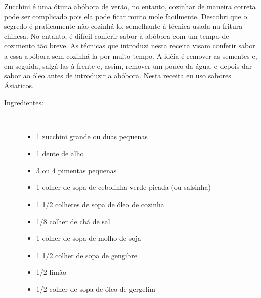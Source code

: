 \documentclass[11pt,letterpaper]{article}
\begin{document}


Zucchini é uma ótima abóbora de verão, no entanto, cozinhar de maneira correta pode ser complicado pois ela pode ficar muito mole facilmente. Descobri que o segredo é praticamente não cozinhá-lo, semelhante à técnica usada na fritura chinesa. No entanto, é difícil conferir sabor à abóbora com um tempo de cozimento tão breve. As técnicas que introduzi nesta receita visam conferir sabor a essa abóbora sem cozinhá-la por muito tempo. A idéia é remover as sementes e, em seguida, salgá-las à frente e, assim, remover um pouco da água, e depois dar sabor ao óleo antes de introduzir a abóbora. Nesta receita eu uso sabores Ásiaticos.

\begin {description}

\item [Ingredientes:] \ \\
\begin {itemize}
\item 1 zucchini grande ou duas pequenas
\item 1 dente de alho
\item 3 ou 4 pimentas pequenas
\item 1 colher de sopa de cebolinha verde picada (ou salsinha)
\item 1 1/2 colheres de sopa de óleo de cozinha
\item 1/8 colher de chá de sal
        \item 1 colher de sopa de molho de soja
        \item 1 1/2 colher de sopa de gengibre
        \item 1/2 limão
        \item 1/2 colher de sopa de óleo de gergelim
\end {itemize}


\end{description}
\end{document}
